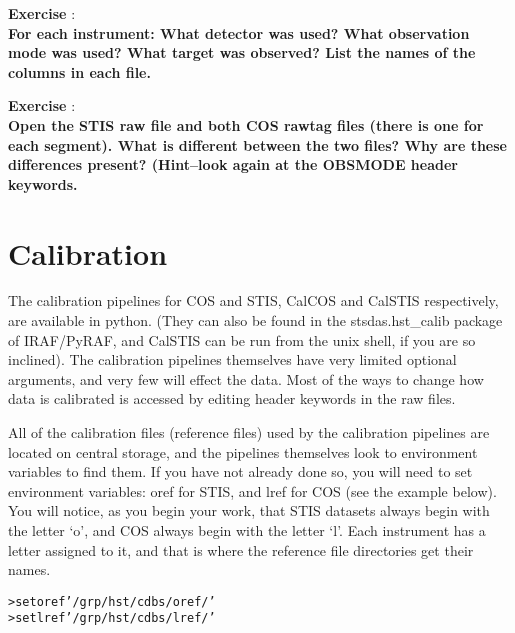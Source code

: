 {\bf \color{blue} Exercise  }:  \\
{\bf For each instrument: What detector was used? What observation mode was used? What target was observed? List the names of the columns in each file.}

{\bf \color{blue} Exercise  }:  \\
{\bf Open the STIS raw file and both COS rawtag files (there is one for each segment). What is different between the {\color{red}{format of the}} two files? Why are these differences present? (Hint--look again at the OBSMODE header keywords. {\color{red}{What does it mean to be taken in TIME-TAG rather than ACCUM?)}}}

\section{Calibration}
The calibration pipelines for COS and STIS, CalCOS and CalSTIS respectively, are available in python. (They can also be found in the stsdas.hst\_calib package of IRAF/PyRAF, and CalSTIS can be run from the unix shell, if you are so inclined). The calibration pipelines themselves have very limited optional arguments, and very few will effect the data. Most of the ways to change how data is calibrated is accessed by editing header keywords in the raw files. 

All of the calibration files (reference files) used by the calibration pipelines are located on central storage, and the pipelines themselves look to environment variables to find them. If you have not already done so, you will need to set environment variables: oref for STIS, and lref for COS (see the example below). {\color{red}{If you haven't already set these in your shell file, it would be benificial to do so now.}} You will notice, as you begin your work, that STIS datasets always begin with the letter `o', and COS always begin with the letter `l'.  Each instrument has a letter assigned to it, and that is where the reference file directories get their names.
\begin{alltt}
> set oref '/grp/hst/cdbs/oref/'
> set lref '/grp/hst/cdbs/lref/'
\end{alltt}

